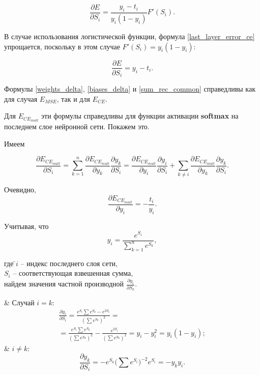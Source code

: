 \begin{equation}
	\label{last_layer_error_ce}
	\frac{\partial E}{\partial S_i} = \frac{y_i - t_i}{y_i(1-y_i)}F'(S_i).
\end{equation}

В случае использования логистической функции, формула \ref{last_layer_error_ce} упрощается, поскольку в этом случае $F'(S_i)=y_i(1-y_i)$:

\begin{equation}
	\frac{\partial E}{\partial S_i} = y_i - t_i.
\end{equation}

Формулы \ref{weights_delta}, \ref{biases_delta} и \ref{sum_rec_common} справедливы как для случая $E_{MSE}$, так и для $E_{CE}$.

Для $E_{CE_{mult}}$ эти формулы справедливы для функции активации \textbf{softmax} на последнем слое нейронной сети. Покажем это.

Имеем

\begin{equation}
	\label{common_E}
	\frac{\partial E_{CE_{mult}}}{\partial S_i} = \sum_{k=1}^{n} \frac{\partial E_{CE_{mult}}}{\partial y_k}\frac{\partial y_k}{\partial S_i} = \frac{\partial E_{CE_{mult}}}{\partial y_i}\frac{\partial y_i}{\partial S_i} + \sum_{k\neq i}\frac{\partial E_{CE_{mult}}}{\partial y_k}\frac{\partial y_k}{\partial S_i}.
\end{equation}

Очевидно, 
\begin{equation}
\label{part_deriv_y}
\frac{\partial E_{CE_{mult}}}{\partial y_i} = -\frac{t_i}{y_i}.
\end{equation}

Учитывая, что
\begin{equation}
	y_i = \frac{e^{S_i}}{\sum_{k=1}^{n} e^{S_k}},
\end{equation}
\begin{tabbing}	
где \=$i$ -- индекс последнего слоя сети,\\
\>$S_i$ -- соответствующая взвешенная сумма,\\ найдем значения частной производной $\frac{\partial y_i}{\partial S_k}$.
\end{tabbing}

\begin{easylistNum}
	& Случай $i = k$:
	\begin{multline}
		\label{part1_deriv_S}
		\frac{\partial y_i}{\partial S_i} = \frac{e^{S_i}\sum e^{S_k} - e^{2S_i}}{(\sum e^{S_k})^2} = \\ = \frac{e^{S_i}\sum e^{S_k}}{(\sum e^{S_k})^2}-\frac{e^{2S_i}}{(\sum e^{S_k})^2}=y_i - y_i^2 = y_i(1-y_i);
	\end{multline}
	& $i \neq k$:
	\begin{equation}
		\label{part2_deriv_S}
		\frac{\partial y_k}{\partial S_i} = -e^{S_k}\Big(\sum e^{S_i}\Big)^{-2}e^{S_i} = -y_ky_i.
	\end{equation}
\end{easylistNum}

